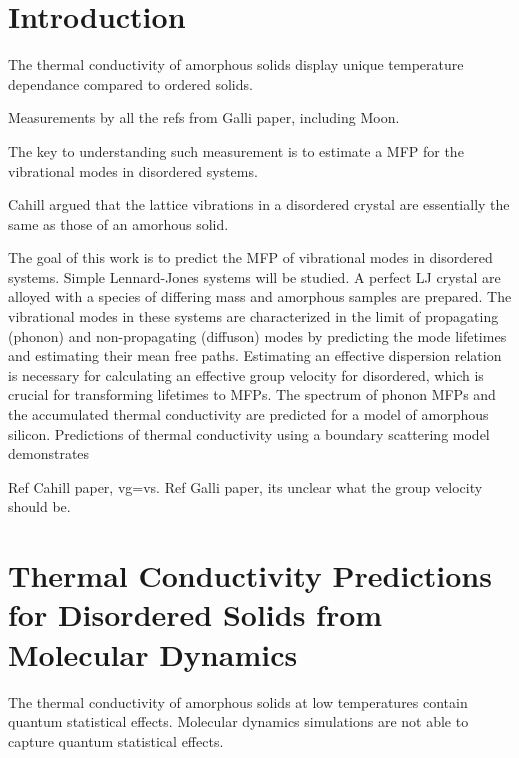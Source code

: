 \documentclass[aps,prb,preprint,superscriptaddress,amsmath,amssymb,floatfix]{revtex4}
\begin{document}
\section{\label{S:Introduction}Introduction}
The thermal conductivity of amorphous solids display 
unique temperature dependance compared to ordered solids.
\cite{freeman_thermal_1986}

Measurements by all the refs from Galli paper, including Moon.
\cite{wada_thermal_1996}\cite{zink_thermal_2006}
\cite{yang_anomalously_2010}\cite{cahill_thermal_1994}
\cite{kuo_thermal_1992}\cite{moon_thermal_2002}
\cite{liu_high_2009}

The key to understanding such measurement is to estimate a MFP for the 
vibrational modes in disordered systems. 

Cahill argued that the lattice vibrations in a disordered crystal are 
essentially the same as those of an amorhous solid.
\cite{cahill_lower_1992} 

The goal of this work is to predict the MFP of vibrational modes in 
disordered systems. Simple Lennard-Jones systems will be studied.  A 
perfect LJ crystal are alloyed with a species of differing mass and 
amorphous samples are prepared. The vibrational modes in these systems are
characterized in the limit of propagating (phonon) and 
non-propagating (diffuson) modes by predicting the mode lifetimes and 
estimating their mean free paths. Estimating an effective dispersion
relation is necessary for calculating an effective group velocity for 
disordered, which is crucial for transforming lifetimes to MFPs.
The spectrum of phonon MFPs and the accumulated thermal conductivity 
are predicted for a model of amorphous silicon. Predictions of thermal 
conductivity using a boundary scattering model demonstrates  

Ref Cahill paper, vg=vs. Ref Galli paper, its unclear what the group 
velocity should be.\cite{he_heat_2011}



\section{\label{S:Lifetimes}Thermal Conductivity Predictions for 
Disordered Solids from Molecular Dynamics}
The thermal conductivity of amorphous solids at low temperatures contain 
quantum statistical effects.\cite{freeman_thermal_1986} Molecular dynamics 
simulations are not able to capture quantum statistical effects.
\end{document}
